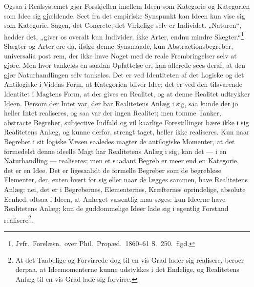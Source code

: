 \documentclass[12pt]{book}
\newcommand{\opage}[1]{\marginnote{\footnotesize\textit{[#1]}}}
\begin{document}
Ogsaa i Realsystemet gjør Forskjellen imellem Ideen som Kategorie og Kategorien som Idee sig
gjældende. Seet fra det empiriske Synspunkt kan Ideen kun vise sig som Kategorie. Sagen, det
Concrete, det Virkelige selv er Individet. „Naturen“, hedder det, „giver os overalt kun Individer,
ikke Arter, endnu mindre Slægter.“\footnote{Jvfr.\ Forelæsn.\ over Phil.\ Propæd.\ 1860--61
S.~250.\ flgd.} Slægter og Arter ere da, ifølge denne Synsmaade, kun Abstractionsbegreber,
universalia post rem, der ikke have Noget med de reale Frembringelser selv at gjøre. Men hvor
tankeløs en saadan Opfattelse er, kan allerede sees deraf, at den gjør Naturhandlingen selv
tankeløs. Det er ved Identiteten af det Logiske og det Antilogiske i Videns Form, at Kategorien
bliver Idee; det er ved den tilsvarende Identitet i Magtens Form, at der gives en Realitet, og at
denne Realitet udtrykker Ideen. Dersom der Intet var, der bar Realitetens Anlæg i sig, saa kunde
der jo heller Intet realiseres, og saa var der ingen Realitet; men tomme Tanker, abstracte
Begreber, subjective Indfald og vil%
\opage{224} kaarlige Forestillinger bære ikke i sig Realitetens Anlæg, og kunne derfor, strengt taget, heller
ikke realiseres. Kun naar Begrebet i sit logiske Væsen saaledes magter de antilogiske Momenter, at
det formedelst denne ideelle Magt har Realitetens Anlæg i sig, kan det --- i en Naturhandling ---
realiseres; men et saadant Begreb er meer end en Kategorie, det er en Idee. Det er ligesaalidt de
formelle Begreber som de begrebløse Elementer, der, enten hvert for sig eller naar de lægges
sammen, have Realitetens Anlæg; nei, det er i Begrebernes, Elementernes, Kræfternes oprindelige,
absolute Eenhed, altsaa i Ideen, at Anlæget væsentlig maa søges: kun Ideerne have Realitetens
Anlæg; kun de guddommelige Ideer lade sig i egentlig Forstand realisere\footnote{At det Taabelige
og Forvirrede dog til en vis Grad lader sig realisere, beroer derpaa, at Ideemomenterne kunne
udstykkes i det Endelige, og Realitetens Anlæg til en vis Grad lade sig forvirre.}.
\end{document}
